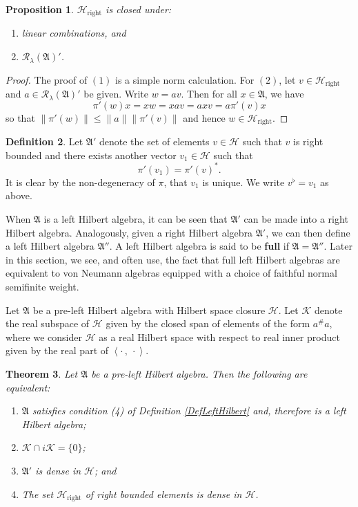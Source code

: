 \documentclass[12pt]{amsart}
\newtheorem{thm}{Theorem}[section]
\newtheorem{prop}[thm]{Proposition}
\theoremstyle{definition}
\newtheorem{defn}[thm]{Definition}
\def\cal{\mathcal}
\newcommand\ip[2]{\left\langle #1\, ,\!\ #2 \right\rangle}
\newcommand\R{{\cal R}}
\def \rt{\operatorname{right}}
\begin{document}
\begin{prop}\label{rightBoundedClosed}
    $\cal H_{\rt}$ is closed under:
    \begin{enumerate}
        \item linear combinations, and
        \item $\R_{\lambda}(\mathfrak{A})'$.
    \end{enumerate}
\end{prop}

\begin{proof}
    The proof of $(1)$ is a simple norm calculation.  For $(2)$, let $v \in \cal H_{\rt}$ and $a \in \R_{\lambda}(\mathfrak{A})'$ be given.  Write $w = av$.  Then for all $x \in \mathfrak{A}$, we have
    \[
    \pi'(w)x = xw = xav = axv = a\pi'(v)x 
    \]
    so that $\|\pi'(w)\| \leq \|a\|\|\pi'(v)\|$ and hence $w \in \cal H_{\rt}$.
\end{proof}

\begin{defn}
    Let $\mathfrak{A}'$ denote the set of elements $v \in \cal H$ such that $v$ is right bounded and there exists another vector $v_1 \in \cal H$ such that
    \[
    \pi'(v_1) = \pi'(v)^*.
    \]
    It is clear by the non-degeneracy of $\pi$, that $v_1$ is unique.  We write $v^\flat = v_1$ as above.
\end{defn}

When $\mathfrak{A}$ is a left Hilbert algebra, it can be seen that $\mathfrak{A}'$ can be made into a right Hilbert algebra.  Analogously, given a right Hilbert algebra $\mathfrak{A}'$, we can then define a left Hilbert algebra $\mathfrak{A}{''}$.  A left Hilbert algebra is said to be \textbf{full} if $\mathfrak{A} = \mathfrak{A}{''}$.  Later in this section, we see, and often use, the fact that full left Hilbert algebras are equivalent to von Neumann algebras equipped with a choice of faithful normal semifinite weight.

Let $\mathfrak{A}$ be a pre-left Hilbert algebra with Hilbert space closure $\cal H$.  Let $\cal K$ denote the real subspace of $\cal H$ given by the closed span of elements of the form $a^\# a$, where we consider $\cal H$ as a real Hilbert space with respect to real inner product given by the real part of $\ip{\cdot}{\cdot}$.

\begin{thm}\label{HilbertEquivalentConditions}
    Let $\mathfrak{A}$ be a pre-left Hilbert algebra.  Then the following are equivalent:
    \begin{enumerate}
        \item $\mathfrak{A}$ satisfies condition (4) of Definition \ref{DefLeftHilbert} and, therefore is a left Hilbert algebra;
        \item $\cal K \cap i\cal K = \{0\}$;
        \item $\mathfrak{A}'$ is dense in $\cal H$; and
        \item The set $\cal H_{\rt}$ of right bounded elements is dense in $\cal H$.
    \end{enumerate}
\end{thm}
\end{document}
